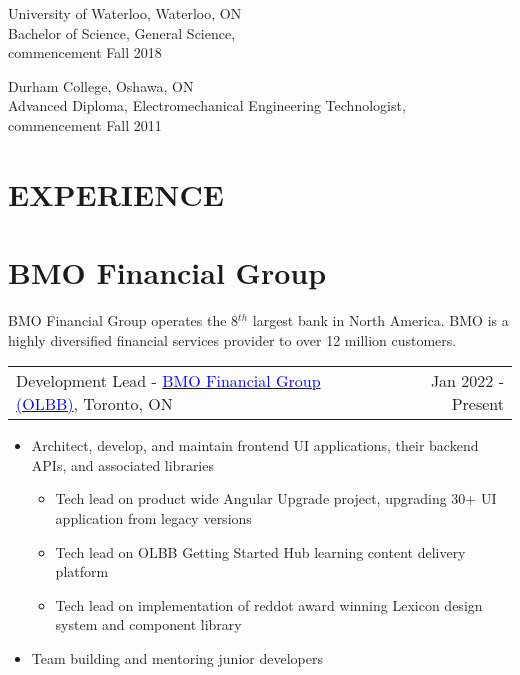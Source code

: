 \documentclass[margin]{res}
\begin{document}
\begin{resume}
	University of Waterloo, Waterloo, ON \\
	Bachelor of Science, General Science, \\
	commencement Fall 2018

	Durham College, Oshawa, ON \\
	Advanced Diploma, Electromechanical Engineering Technologist, \\
	commencement Fall 2011


	\section{\textcolor{NavyBlue}{EXPERIENCE}}

	\normalsize{\section{BMO Financial Group}}

	BMO Financial Group operates the 8\begin{math}^{th}\end{math} largest bank in North America. 
	BMO is a highly diversified financial services provider to over 12 million customers.

	\begin{tabular}{p{3in} r} %
		Development Lead - \href{https://bmo.com}{\textcolor{blue}{BMO Financial Group (OLBB)}}, Toronto, ON & Jan 2022 - Present
	\end{tabular}

	\begin{itemize} %
		\item Architect, develop, and maintain frontend UI applications, their backend APIs, and associated libraries
		\begin{itemize} 
			\item Tech lead on product wide Angular Upgrade project, upgrading 30+ UI application from legacy versions 
			\item Tech lead on OLBB Getting Started Hub learning content delivery platform
			\item Tech lead on implementation of reddot award winning Lexicon design system and component library
		 \end{itemize}
		\item Team building and mentoring junior developers
	\end{itemize}


\end{resume}
\end{document}
